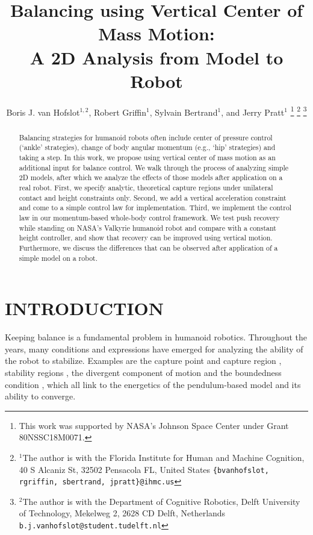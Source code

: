 \documentclass[letterpaper, 10 pt, conference]{ieeeconf}  %
\title{\LARGE \bf
Balancing using Vertical Center of Mass Motion: \\ A 2D Analysis from Model to Robot
}
\author{Boris J. van Hofslot$^{1,2}$, Robert Griffin$^1$, Sylvain Bertrand$^1$, and Jerry Pratt$^1$%
\thanks{This work was supported by NASA's Johnson Space Center under Grant 80NSSC18M0071.}%
\thanks{$^{1}$The author is with the Florida Institute for Human and Machine Cognition, 40 S Alcaniz St, 32502 Pensacola FL, United States
        {\tt\small \{bvanhofslot, rgriffin, sbertrand, jpratt\}@ihmc.us}}%
\thanks{$^{2}$The author is with the Department of Cognitive Robotics, Delft University of Technology, Mekelweg 2, 2628 CD Delft, Netherlands
        {\tt\small b.j.vanhofslot@student.tudelft.nl}}%
}
\begin{document}
\maketitle
\thispagestyle{empty}
\pagestyle{empty}



\begin{abstract}
Balancing strategies for humanoid robots often include center of pressure control (`ankle' strategies), change of body angular momentum (e.g., `hip' strategies) and taking a step. In this work, we propose using vertical center of mass motion as an additional input for balance control. We walk through the process of analyzing simple 2D models, after which we analyze the effects of those models after application on a real robot. First, we specify analytic, theoretical capture regions under unilateral contact and height constraints only. Second, we add a vertical acceleration constraint and come to a simple control law for implementation. Third, we implement the control law in our momentum-based whole-body control framework. We test push recovery while standing on NASA's Valkyrie humanoid robot and compare with a constant height controller, and show that recovery can be improved using vertical motion. Furthermore, we discuss the differences that can be observed after application of a simple model on a robot.
\end{abstract}



\section{INTRODUCTION}
Keeping balance is a fundamental problem in humanoid robotics. Throughout the years, many conditions and expressions have emerged for analyzing the ability of the robot to stabilize. Examples are the capture point and capture region \cite{pratt2006capture, koolen2012capturability}, stability regions \cite{stephens2007humanoid}, the divergent component of motion \cite{takenaka2009real} and the boundedness condition \cite{lanari2014boundedness}, which all link to the energetics of the pendulum-based model and its ability to converge.
\end{document}
